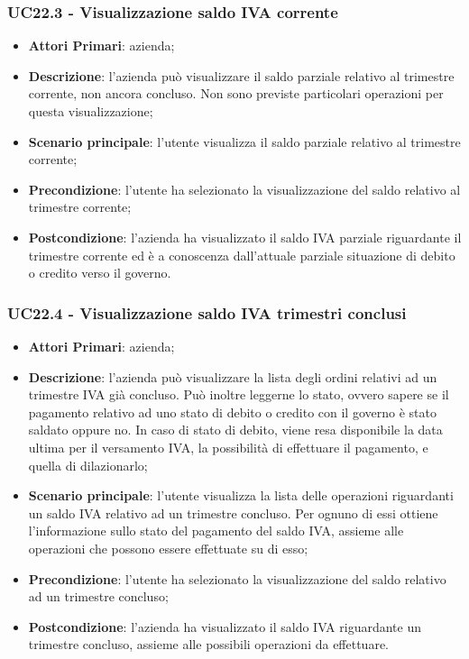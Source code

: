 \subsubsection{UC22.3 - Visualizzazione saldo IVA corrente}
\begin{itemize}
	\item \textbf{Attori Primari}: azienda;
	\item \textbf{Descrizione}: l'azienda può visualizzare il saldo parziale relativo al trimestre corrente, non ancora concluso. Non sono previste particolari operazioni per questa visualizzazione;
	\item \textbf{Scenario principale}: l'utente visualizza il saldo parziale relativo al trimestre corrente;
	\item \textbf{Precondizione}: l'utente ha selezionato la visualizzazione del saldo relativo al trimestre corrente;
	\item \textbf{Postcondizione}: l'azienda ha visualizzato il saldo IVA parziale riguardante il trimestre corrente ed è a conoscenza dall'attuale parziale situazione di debito o credito verso il governo.
\end{itemize} 

\subsubsection{UC22.4 - Visualizzazione saldo IVA trimestri conclusi}
\begin{itemize}
	\item \textbf{Attori Primari}: azienda;
	\item \textbf{Descrizione}: l'azienda può visualizzare la lista degli ordini relativi ad un trimestre IVA già concluso. Può inoltre leggerne lo stato, ovvero sapere se il pagamento relativo ad uno stato di debito o credito con il governo è stato saldato oppure no. In caso di stato di debito, viene resa disponibile la data ultima per il versamento IVA, la possibilità di effettuare il pagamento, e quella di dilazionarlo;
	\item \textbf{Scenario principale}: l'utente visualizza la lista delle operazioni riguardanti  un saldo IVA relativo ad un trimestre concluso. Per ognuno di essi ottiene l'informazione sullo stato del pagamento del saldo IVA, assieme alle operazioni che possono essere effettuate su di esso;
	\item \textbf{Precondizione}: l'utente ha selezionato la visualizzazione del saldo relativo ad un trimestre concluso;
	\item \textbf{Postcondizione}: l'azienda ha visualizzato il saldo IVA riguardante un trimestre concluso, assieme alle possibili operazioni da effettuare.
\end{itemize} 

